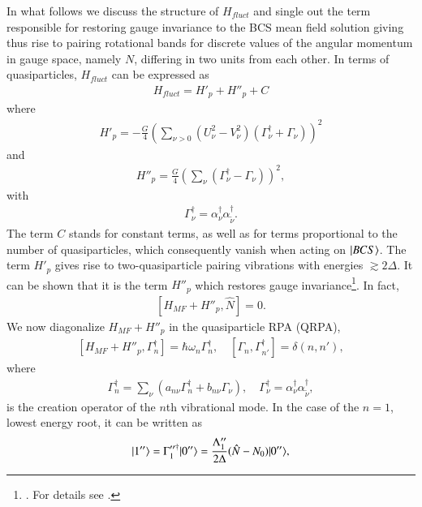 In what follows we  discuss the structure of $H_{fluct}$ and single out the term responsible for restoring gauge invariance to the BCS mean field solution giving thus rise to pairing rotational bands for discrete values of the angular momentum in gauge space, namely $N$, differing in two units from each other. In terms of quasiparticles, $H_{fluct}$ can be expressed  as
\begin{align}\label{eq0.1.91}
H_{fluct}=H'_p+H''_p+C
\end{align}
where 
\begin{align}\label{eq0.1.92}
H'_p=-\frac{G}{4}\left(\sum_{\nu>0}\left(U^2_\nu-V^2_\nu\right)\left(\Gamma^\dagger_\nu+\Gamma_\nu\right)\right)^2
\end{align}
and
\begin{align}\label{eq0.1.93}
H''_p=\frac{G}{4}\left(\sum_{\nu}\left(\Gamma^\dagger_\nu-\Gamma_\nu\right)\right)^2,
\end{align}
with
\begin{align}\label{eq0.1.94}
\Gamma^\dagger_\nu=\alpha^\dagger_\nu\alpha_{\tilde \nu}^\dagger.
\end{align}
The term $C$ stands for constant terms, as well as for terms proportional to the number of quasiparticles, which consequently vanish when acting on $|{BCS} \rangle$. The term $H'_p$ gives rise to two-quasiparticle pairing vibrations with energies $\gtrsim2\Delta$. It can be shown that it is the term $H''_p$ which restores gauge invariance\footnote{\cite{Hogassen:61,Bes:66}. For details see \cite{Brink:05}.}. In fact,
\begin{align}\label{eq0.1.95}
\left[H_{MF}+H''_p,\hat N\right]=0.
\end{align}
We now diagonalize $H_{MF}+H''_p$ in the quasiparticle RPA (QRPA),
\begin{align}\label{eq0.1.96}
\left[H_{MF}+H''_p,\Gamma^\dagger_n\right]=\hbar\omega_n\Gamma^\dagger_n,\quad \left[\Gamma_n,\Gamma^\dagger_{n'}\right]=\delta(n,n'),
\end{align}
where
\begin{align}\label{eq0.1.97}
\Gamma^\dagger_n=\sum_{\nu}\left(a_{n\nu}\Gamma^\dagger_n+b_{n\nu}\Gamma_\nu\right),\quad \Gamma^\dagger_\nu=\alpha^\dagger_\nu\alpha^\dagger_{\tilde\nu},	
\end{align}
is the creation operator of the $n$th vibrational mode. In the case of the $n=1$, lowest energy root, it can be written as
\begin{align}\label{eq0.1.98}
|{1''} \rangle=\Gamma''^\dagger_1|{0''} \rangle=\frac{\Lambda''_1}{2\Delta}(\hat N-N_0)|{0''} \rangle,	
\end{align}
